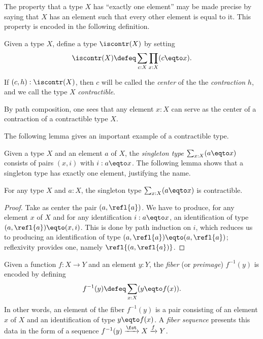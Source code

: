 The property that a type $X$ has ``exactly one element'' may be made precise
by saying that $X$ has an element such that every other element is equal to it.
This property is encoded in the following definition.

\begin{definition}
  \label{def:contractible}
  Given a type $X$, define a type $\iscontr(X)$ by setting
  \[
    \iscontr(X) \defeq \sum_{c:X} \prod_{x:X} (c \eqto x).\qedhere
  \]
\end{definition}

If $ (c,h) : \iscontr(X) $, then $c$ will be called the \emph{center} of the
the \emph{contraction} $h$, and we call the type $X$ \emph{contractible}.

By path composition, one sees that any element $x : X$ can serve as the center of a contraction of a contractible type $X$.

The following lemma gives an important example of a contractible type.

Given a type $X$ and an element $a$ of $X$,
the \emph{singleton type} $\sum_{x:X} (a \eqto x)$
consists of pairs $(x,i)$ with $i: a \eqto x$. The following lemma shows that a singleton type has exactly one element, justifying the name.

\begin{lemma}\label{lem:thepathspaceiscontractible}
For any type $X$ and $a:X$, the singleton type $\sum_{x:X} (a \eqto x)$ is contractible.
\end{lemma}

\begin{proof}
Take as center the pair $(a,\refl{a})$. We have
to produce, for any element $x$ of $X$ and for any identification
$i: a \eqto x$, an identification of type $(a,\refl{a}) \eqto (x,i)$.  This is done by path induction on $i$, which reduces us to producing
an identification of type $(a,\refl{a}) \eqto (a,\refl{a})$; reflexivity provides one, namely $\refl{(a,\refl{a})}$.
\end{proof}

\begin{definition}
\label{def:fiber}
Given a function $f : X \to Y$ and an element $y:Y$,
the \emph{fiber} (or \emph{preimage}) $f^{-1}(y)$
is encoded by defining $$f^{-1}(y) \defeq \sum_{x:X}(y \eqto f(x)).$$
In other words, an element of the fiber $f^{-1}(y)$ is a pair consisting
of an element $x$ of $X$ and an identification of type $y \eqto f(x)$.
A \emph{fiber sequence} presents this data in the form
of a sequence  $f^{-1}(y)\xrightarrow{\fst} X \xrightarrow{f} Y$.
\end{definition}

